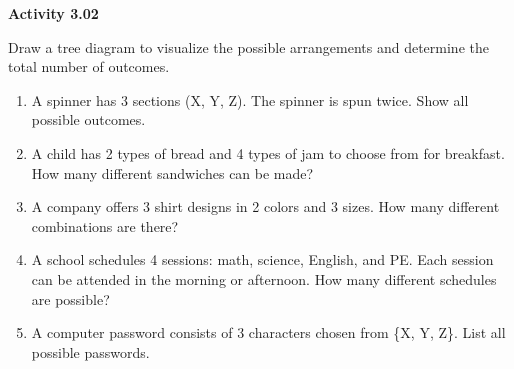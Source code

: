 \vspace{0.3ex}
\noindent\textbf{Activity 3.02}

\vspace{0.2ex}

Draw a tree diagram to visualize the possible arrangements and determine the total number of outcomes.

\begin{enumerate}[label=\color{blue}\arabic*.]
    \item A spinner has 3 sections (X, Y, Z). The spinner is spun twice. Show all possible outcomes.
    \item A child has 2 types of bread and 4 types of jam to choose from for breakfast. How many different sandwiches can be made?
    \item A company offers 3 shirt designs in 2 colors and 3 sizes. How many different combinations are there?
    \item A school schedules 4 sessions: math, science, English, and PE. Each session can be attended in the morning or afternoon. How many different schedules are possible?
    \item A computer password consists of 3 characters chosen from \{X, Y, Z\}. List all possible passwords.
\end{enumerate}
